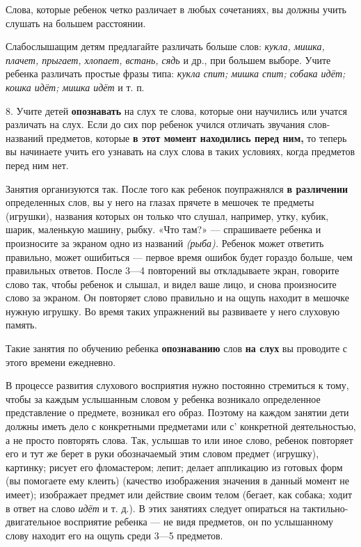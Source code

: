 \documentclass[a5paper]{book}
\renewcommand{\emph}[1]{\textit{#1}}
\begin{document}
Слова, которые ребенок четко различает в любых сочетаниях, вы должны
учить слушать на большем расстоянии.

Слабослышащим детям предлагайте различать больше слов: \emph{кукла,
мишка, плачет, прыгает, хлопает, встань, сядь} и др., при большем
выборе. Учите ребенка различать простые фразы типа: \emph{кукла спит;
мишка спит; собака идёт; кошка идёт; мишка идёт} и т. п.

8. Учите детей \textbf{опознавать} на слух те слова, которые они
научились или учатся различать на слух. Если до сих пор ребенок учился
отличать звучания слов-названий предметов, которые \textbf{в этот момент
находились перед ним,} то теперь вы начинаете учить его узнавать на слух
слова в таких условиях, когда предметов перед ним нет.

Занятия организуются так. После того как ребенок поупражнялся \textbf{в
различении} определенных слов, вы у него на глазах прячете в мешочек те
предметы (игрушки), названия которых он только что слушал, например,
утку, кубик, шарик, маленькую машину, рыбку. «Что там?» --- спрашиваете
ребенка и произносите за экраном одно из названий \emph{(рыба).} Ребенок
может ответить правильно, может ошибиться --- первое время ошибок будет
гораздо больше, чем правильных ответов. После 3---4 повторений вы
откладываете экран, говорите слово так, чтобы ребенок и слышал, и видел
ваше лицо, и снова произносите слово за экраном. Он повторяет слово
правильно и на ощупь находит в мешочке нужную игрушку. Во время таких
упражнений вы развиваете у него слуховую память.

Такие занятия по обучению ребенка \textbf{опознаванию} слов \textbf{на
слух} вы проводите с этого времени ежедневно.

В процессе развития слухового восприятия нужно постоянно стремиться к
тому, чтобы за каждым услышанным словом у ребенка возникало определенное
представление о предмете, возникал его образ. Поэтому на каждом занятии
дети должны иметь дело с конкретными предметами или с' конкретной
деятельностью, а не просто повторять слова. Так, услышав то или иное
слово, ребенок повторяет его и тут же берет в руки обозначаемый этим
словом предмет (игрушку), картинку; рисует его фломастером; лепит;
делает аппликацию из готовых форм (вы помогаете ему клеить) (качество
изображения значения в данный момент не имеет); изображает предмет или
действие своим телом (бегает, как собака; ходит в ответ на слово
\emph{идёт} и т. д.). В этих занятиях следует опираться на
тактильно-двигательное восприятие ребенка --- не видя предметов, он по
услышанному слову находит его на ощупь среди 3---5 предметов.
\end{document}

